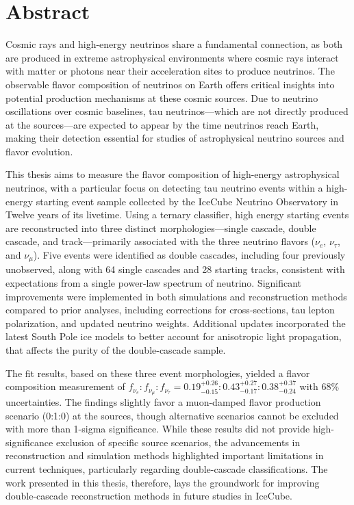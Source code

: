 \chapter{Abstract}
Cosmic rays and high-energy neutrinos share a fundamental connection, as both are produced in extreme astrophysical environments where cosmic rays interact with matter or photons near their acceleration sites to produce neutrinos. The observable flavor composition of neutrinos on Earth offers critical insights into potential production mechanisms at these cosmic sources. Due to neutrino oscillations over cosmic baselines, tau neutrinos—which are not directly produced at the sources—are expected to appear by the time neutrinos reach Earth, making their detection essential for studies of astrophysical neutrino sources and flavor evolution. 

This thesis aims to measure the flavor composition of high-energy astrophysical neutrinos, with a particular focus on detecting tau neutrino events within a high-energy starting event sample collected by the IceCube Neutrino Observatory in Twelve years of its livetime. Using a ternary classifier, high energy starting events are reconstructed into three distinct morphologies—single cascade, double cascade, and track—primarily associated with the three neutrino flavors (\( \nu_e \), \( \nu_\tau \), and \( \nu_\mu \)). Five events were identified as double cascades, including four previously unobserved, along with 64 single cascades and 28 starting tracks, consistent with expectations from a single power-law spectrum of neutrino. Significant improvements were implemented in both simulations and reconstruction methods compared to prior analyses, including corrections for cross-sections, tau lepton polarization, and updated neutrino weights. Additional updates incorporated the latest South Pole ice models to better account for anisotropic light propagation, that affects the purity of the double-cascade sample.

The fit results, based on these three event morphologies, yielded a flavor composition measurement of \( f_{\nu_e} : f_{\nu_{\mu}} : f_{\nu_{\tau}} = 0.19_{-0.15}^{+0.26} : 0.43_{-0.17}^{+0.27} : 0.38_{-0.24}^{+0.37} \) with 68\% uncertainties. The findings slightly favor a muon-damped flavor production scenario (0:1:0) at the sources, though alternative scenarios cannot be excluded with more than 1-sigma significance. While these results did not provide high-significance exclusion of specific source scenarios, the advancements in reconstruction and simulation methods highlighted important limitations in current techniques, particularly regarding double-cascade classifications. The work presented in this thesis, therefore, lays the groundwork for improving double-cascade reconstruction methods in future studies in IceCube. 


